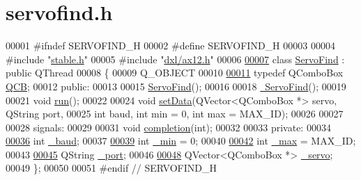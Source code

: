 \hypertarget{a00022_source}{}\section{servofind.\+h}

\begin{DoxyCode}
00001 \textcolor{preprocessor}{#ifndef SERVOFIND\_H}
00002 \textcolor{preprocessor}{#define SERVOFIND\_H}
00003 
00004 \textcolor{preprocessor}{#include "\hyperlink{a00025}{stable.h}"}
00005 \textcolor{preprocessor}{#include "\hyperlink{a00011}{dxl/ax12.h}"}
00006 
\hypertarget{a00022_source_l00007}{}\hyperlink{a00008}{00007} \textcolor{keyword}{class }\hyperlink{a00008}{ServoFind} : \textcolor{keyword}{public} QThread
00008 \{
00009     Q\_OBJECT
00010     
\hypertarget{a00022_source_l00011}{}\hyperlink{a00008_a8cfdbef4d4dc51f1b200a885ff827711}{00011}     \textcolor{keyword}{typedef} QComboBox \hyperlink{a00008_a8cfdbef4d4dc51f1b200a885ff827711}{QCB};
00012 \textcolor{keyword}{public}:
00013     
00015     \hyperlink{a00008_ad9b1d82aecc71025fb606b79b9bf6ce1}{ServoFind}();
00016     
00018     \hyperlink{a00008_a5f353598d5d40289c039412288e5bf73}{~ServoFind}();
00019     
00021     \textcolor{keywordtype}{void} \hyperlink{a00008_a4edb0ac2852a93f84c6aa04d5953e28d}{run}();
00022     
00024     \textcolor{keywordtype}{void} \hyperlink{a00008_a440f961980162cfd7c2ca9031b2a76e8}{setData}(QVector<QComboBox *> servo, QString port, 
00025                  \textcolor{keywordtype}{int} baud, \textcolor{keywordtype}{int} min = 0, \textcolor{keywordtype}{int} max = MAX\_ID);
00026     
00027     
00028 signals:
00029     
00031     \textcolor{keywordtype}{void} \hyperlink{a00008_a8ae9f951508e8376c3c7421df37ea619}{completion}(\textcolor{keywordtype}{int});
00032     
00033 \textcolor{keyword}{private}:
00034     
\hypertarget{a00022_source_l00036}{}\hyperlink{a00008_ad2f3b1ab924ff2051178eb981d030b66}{00036}     \textcolor{keywordtype}{int} \hyperlink{a00008_ad2f3b1ab924ff2051178eb981d030b66}{\_baud};
00037     
\hypertarget{a00022_source_l00039}{}\hyperlink{a00008_a65a3d5606c9a8bcd6ace9be36c3551e1}{00039}     \textcolor{keywordtype}{int} \hyperlink{a00008_a65a3d5606c9a8bcd6ace9be36c3551e1}{\_min} = 0;
00040     
\hypertarget{a00022_source_l00042}{}\hyperlink{a00008_abb4bcc300ab0a9c1df3c41b4e7d1fe2d}{00042}     \textcolor{keywordtype}{int} \hyperlink{a00008_abb4bcc300ab0a9c1df3c41b4e7d1fe2d}{\_max} = MAX\_ID;
00043     
\hypertarget{a00022_source_l00045}{}\hyperlink{a00008_acc6d9f94a8cf7a7a777fd9c818d98207}{00045}     QString \hyperlink{a00008_acc6d9f94a8cf7a7a777fd9c818d98207}{\_port};
00046     
\hypertarget{a00022_source_l00048}{}\hyperlink{a00008_a571ee1fc45255666e5baa0d5e9111551}{00048}     QVector<QComboBox *> \hyperlink{a00008_a571ee1fc45255666e5baa0d5e9111551}{\_servo};    
00049 \};
00050 
00051 \textcolor{preprocessor}{#endif // SERVOFIND\_H}
\end{DoxyCode}
